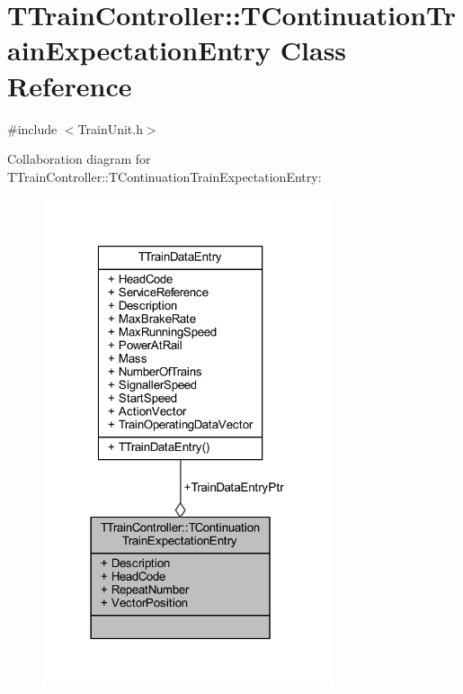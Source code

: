 \hypertarget{class_t_train_controller_1_1_t_continuation_train_expectation_entry}{}\section{T\+Train\+Controller\+:\+:T\+Continuation\+Train\+Expectation\+Entry Class Reference}
\label{class_t_train_controller_1_1_t_continuation_train_expectation_entry}


{\ttfamily \#include $<$Train\+Unit.\+h$>$}



Collaboration diagram for T\+Train\+Controller\+:\+:T\+Continuation\+Train\+Expectation\+Entry\+:\nopagebreak
\begin{figure}[H]
\begin{center}
\leavevmode
\includegraphics[width=242pt]{class_t_train_controller_1_1_t_continuation_train_expectation_entry__coll__graph}
\end{center}
\end{figure}
